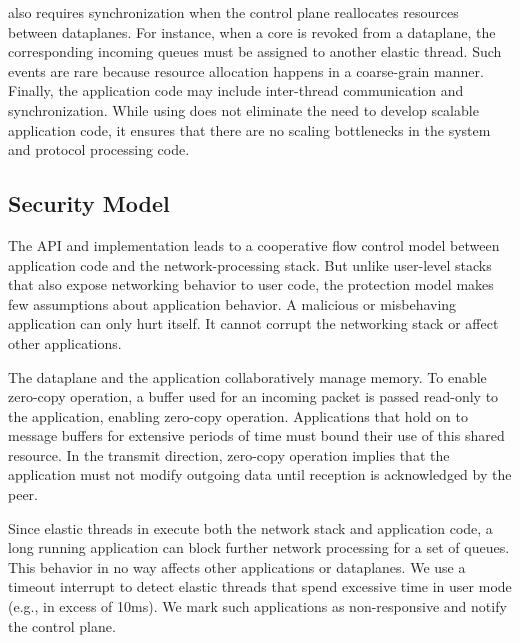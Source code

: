 \ix also requires
synchronization when the control plane reallocates resources between
dataplanes.  For instance, when a core is revoked from a dataplane,
the corresponding incoming queues must be assigned to another elastic
thread. Such events are rare because resource allocation happens in a
coarse-grain manner. Finally, the application code may include
inter-thread communication and synchronization. While using \ix does
not eliminate the need to develop scalable application code, it
ensures that there are no scaling bottlenecks in the system and
protocol processing code. 

\subsection{Security Model}
\label{sec:impl:coop}


The \ix API and implementation leads to a cooperative flow control
model between application code and the network-processing stack.  But
unlike user-level stacks that also expose networking behavior to user
code,   the \ix protection model makes few assumptions about
application behavior. A malicious or misbehaving application can only
hurt itself. It cannot corrupt the networking stack or affect other
applications.

The \ix dataplane and the application collaboratively manage
memory. To enable zero-copy operation, a buffer used for an incoming
packet is passed read-only to the application, enabling zero-copy
operation. Applications that hold on to message buffers for extensive
periods of time must bound their use of this shared resource.  In the
transmit direction, zero-copy operation implies that the application
must not modify outgoing data
until reception is
acknowledged by the peer.

Since elastic threads in \ix execute both the network stack and
application code, a long running application can block further network
processing for a set of queues. This behavior in no way affects other
applications or dataplanes. We use a timeout interrupt to detect
elastic threads that spend excessive time in user mode (e.g., in
excess of 10ms). We mark such applications as non-responsive and
notify the control
plane.

